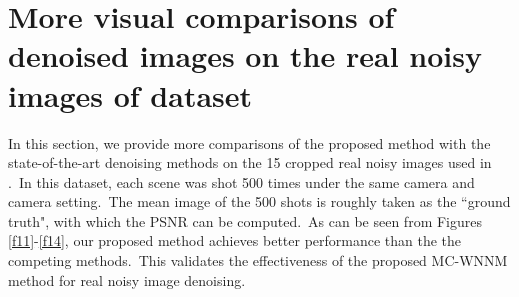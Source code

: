 \documentclass[10pt,onecolumn,letterpaper]{article}
\begin{document}
\section{More visual comparisons of denoised images on the real noisy images of dataset \cite{crosschannel2016}}

In this section, we provide more comparisons of the proposed method with the state-of-the-art denoising methods on the 15 cropped real noisy images used in \cite{crosschannel2016}.\ In this dataset, each scene was shot 500 times under the same camera and camera setting.\ The mean image of the 500 shots is roughly taken as the ``ground truth", with which the PSNR can be computed.\ As can be seen from Figures \ref{f11}-\ref{f14}, our proposed method achieves better performance than the the competing methods.\ This validates the effectiveness of the proposed MC-WNNM method for real noisy image denoising.
\end{document}
